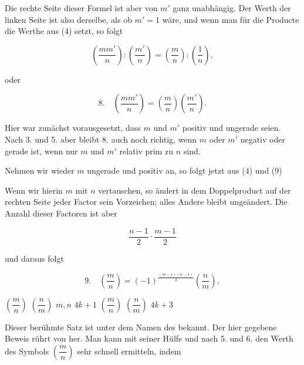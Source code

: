 Die rechte Seite dieser Formel ist aber von $m'$ ganz unabhängig.
Der Werth der linken Seite ist also derselbe, als ob
$m' = 1$ wäre, und wenn man für die Producte die Werthe aus
(4) setzt, so folgt

\[
\left(\frac{mm'}{n}\right) : \left(\frac{m'}{n}\right) = \left(\frac{m}{n}\right) : \left(\frac{1}{n}\right),
\]

oder

\[
8.\quad \left(\frac{mm'}{n}\right) = \left(\frac{m}{n}\right)\left(\frac{m'}{n}\right).
\]

Hier war zunächst vorausgesetzt, dass $m$ und $m'$ positiv und
ungerade seien. Nach 3. und 5. aber bleibt 8. auch noch richtig,
wenn $m$ oder $m'$ negativ oder gerade ist, wenn nur $m$ und $m'$
relativ prim zu $n$ sind.

Nehmen wir wieder $m$ ungerade und positiv an, so folgt
jetzt aus (4) und (9)


Wenn wir hierin $m$ mit $n$ vertauschen, so ändert in dem
Doppelproduct auf der rechten Seite jeder Factor sein Vorzeichen;
alles Andere bleibt ungeändert. Die Anzahl dieser Factoren
ist aber

\[
\frac{n-1}{2} \cdot \frac{m-1}{2}
\]

und daraus folgt

\[
9.\quad \left(\frac{m}{n}\right) = (-1)^{\frac{(m-1)(n-1)}{4}} \left(\frac{n}{m}\right),
\]

 $\left(\dfrac{m}{n}\right)$  $\left(\dfrac{n}{m}\right)$ $m, n$ 
$4k+1$  $\left(\dfrac{m}{n}\right)$  $\left(\dfrac{n}{m}\right)$ $4k+3$ 

Dieser berühmte Satz ist unter dem Namen des 
 bekannt. Der hier gegebene Beweis rührt von
 her. Man kann mit seiner Hülfe und nach 5. und
6. den Werth des Symbols $\left(\dfrac{m}{n}\right)$ sehr schnell ermitteln, indem
